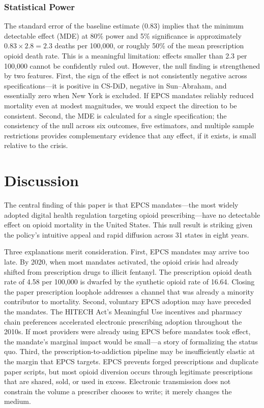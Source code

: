 \documentclass[12pt]{article}
\begin{document}
\subsubsection*{Statistical Power} The standard error of the baseline estimate (0.83) implies that the minimum detectable effect (MDE) at 80\% power and 5\% significance is approximately $0.83 \times 2.8 = 2.3$ deaths per 100,000, or roughly 50\% of the mean prescription opioid death rate. This is a meaningful limitation: effects smaller than 2.3 per 100,000 cannot be confidently ruled out. However, the null finding is strengthened by two features. First, the sign of the effect is not consistently negative across specifications---it is positive in CS-DiD, negative in Sun--Abraham, and essentially zero when New York is excluded. If EPCS mandates reliably reduced mortality even at modest magnitudes, we would expect the direction to be consistent. Second, the MDE is calculated for a single specification; the consistency of the null across six outcomes, five estimators, and multiple sample restrictions provides complementary evidence that any effect, if it exists, is small relative to the crisis.

\section{Discussion}

The central finding of this paper is that EPCS mandates---the most widely adopted digital health regulation targeting opioid prescribing---have no detectable effect on opioid mortality in the United States. This null result is striking given the policy's intuitive appeal and rapid diffusion across 31 states in eight years.

Three explanations merit consideration. First, EPCS mandates may arrive too late. By 2020, when most mandates activated, the opioid crisis had already shifted from prescription drugs to illicit fentanyl. The prescription opioid death rate of 4.58 per 100,000 is dwarfed by the synthetic opioid rate of 16.64. Closing the paper prescription loophole addresses a channel that was already a minority contributor to mortality. Second, voluntary EPCS adoption may have preceded the mandates. The HITECH Act's Meaningful Use incentives and pharmacy chain preferences accelerated electronic prescribing adoption throughout the 2010s. If most providers were already using EPCS before mandates took effect, the mandate's marginal impact would be small---a story of formalizing the status quo. Third, the prescription-to-addiction pipeline may be insufficiently elastic at the margin that EPCS targets. EPCS prevents forged prescriptions and duplicate paper scripts, but most opioid diversion occurs through legitimate prescriptions that are shared, sold, or used in excess. Electronic transmission does not constrain the volume a prescriber chooses to write; it merely changes the medium.
\end{document}
